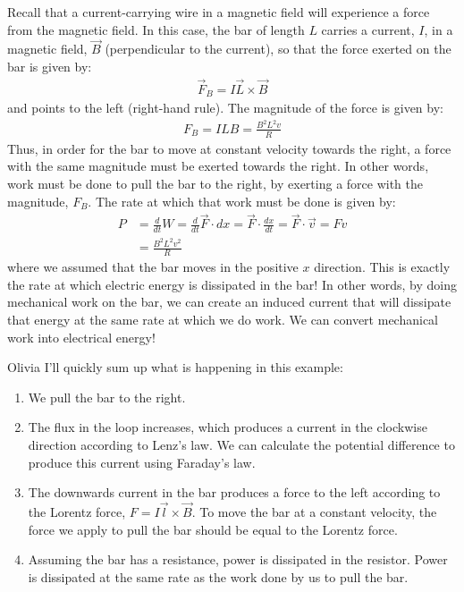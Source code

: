 Recall that a current-carrying wire in a magnetic field will experience a force from the magnetic field. In this case, the bar of length $L$ carries a current, $I$, in a magnetic field, $\vec B$ (perpendicular to the current), so that the force exerted on the bar is given by:
\begin{align*}
\vec F_B = I \vec L \times \vec B
\end{align*}
and points to the left (right-hand rule). The magnitude of the force is given by:
\begin{align*}
F_B = ILB = \frac{B^2L^2v}{R}
\end{align*}
Thus, in order for the bar to move at constant velocity towards the right, a force with the same magnitude must be exerted towards the right. In other words, work must be done to pull the bar to the right, by exerting a force with the magnitude, $F_B$. The rate at which that work must be done is given by:
\begin{align*}
P &= \frac{d}{dt}W=\frac{d}{dt}\vec F \cdot dx=\vec F\cdot \frac{dx}{dt}=\vec F\cdot \vec v = Fv\\
&=\frac{B^2L^2v^2}{R}
\end{align*}
where we assumed that the bar moves in the positive $x$ direction. This is exactly the rate at which electric energy is dissipated in the bar! In other words, by doing mechanical work on the bar, we can create an induced current that will dissipate that energy at the same rate at which we do work. We can convert mechanical work into electrical energy!

\begin{studentOpinion}{Olivia}
I'll quickly sum up what is happening in this example:
\begin{enumerate}
\item We pull the bar to the right.
\item The flux in the loop increases, which produces a current in the clockwise direction according to Lenz's law. We can calculate the potential difference to produce this current using Faraday's law. 
\item The downwards current in the bar produces a force to the left according to the Lorentz force, $F=I\vec{l}\times \vec{B}$. To move the bar at a constant velocity, the force we apply to pull the bar should be equal to the Lorentz force. 
\item Assuming the bar has a resistance, power is dissipated in the resistor. Power is dissipated at the same rate as the work done by us to pull the bar.  
\end{enumerate}
\end{studentOpinion}

